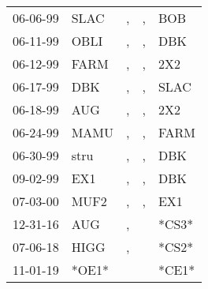 \begin{supertabular}{lllll}
 06-06-99 &   SLAC &  , &  , &    BOB \\
 06-11-99 &   OBLI &  , &  , &    DBK \\
 06-12-99 &   FARM &  , &  , &    2X2 \\
 06-17-99 &    DBK &  , &  , &   SLAC \\
 06-18-99 &    AUG &  , &  , &    2X2 \\
 06-24-99 &   MAMU &  , &  , &   FARM \\
 06-30-99 &   stru &  , &  , &    DBK \\
 09-02-99 &    EX1 &  , &  , &    DBK \\
 07-03-00 &   MUF2 &  , &  , &    EX1 \\
 12-31-16 &    AUG &  , &    &  *CS3* \\
 07-06-18 &   HIGG &  , &    &  *CS2* \\
 11-01-19 &  *OE1* &    &    &  *CE1* \\
\end{supertabular}
